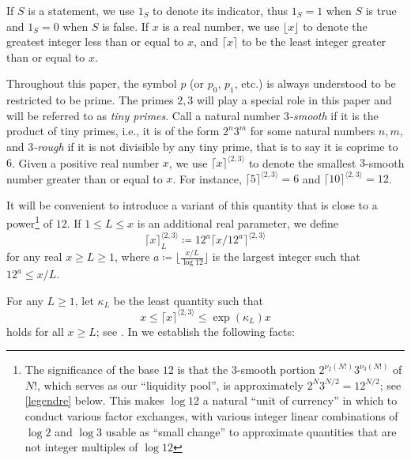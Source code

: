 \documentclass[12pt,a4paper,reqno]{amsart}
\numberwithin{equation}{section}
\theoremstyle{plain}
\theoremstyle{definition}
\begin{document}
If $S$ is a statement, we use $1_S$ to denote its indicator, thus $1_S=1$ when $S$ is true and $1_S=0$ when $S$ is false.  If $x$ is a real number, we use $\lfloor x \rfloor$ to denote the greatest integer less than or equal to $x$, and $\lceil x \rceil$ to be the least integer greater than or equal to $x$.

Throughout this paper, the symbol $p$ (or $p_0$, $p_1$, etc.) is always understood to be restricted to be prime.  The primes $2,3$ will play a special role in this paper and will be referred to as \emph{tiny primes}. 
Call a natural number \emph{$3$-smooth} if it is the product of tiny primes, i.e., it is of the form $2^n 3^m$ for some natural numbers $n,m$, and \emph{$3$-rough} if it is not divisible by any tiny prime, that is to say it is coprime to $6$.  Given a positive real number $x$, we use $\lceil x \rceil^{\langle 2,3 \rangle}$ to denote the smallest $3$-smooth number greater than or equal to $x$.  For instance, $\lceil 5 \rceil^{\langle 2,3 \rangle} = 6$ and $\lceil 10 \rceil^{\langle 2,3 \rangle} = 12$.  

It will be convenient to introduce a variant of this quantity that is close to a power\footnote{The significance of the base $12$ is that the $3$-smooth portion $2^{\nu_2(N!)} 3^{\nu_3(N!)}$ of $N!$, which serves as our ``liquidity pool'', is approximately $2^N 3^{N/2} = 12^{N/2}$; see \eqref{legendre} below.  This makes $\log 12$ a natural ``unit of currency'' in which to conduct various factor exchanges, with various integer linear combinations of $\log 2$ and $\log 3$ usable as ``small change'' to approximate quantities that are not integer multiples of $\log 12$} of $12$.  If $1 \leq L \leq x$ is an additional real parameter, we define
\begin{equation}\label{fancy-kappa-def}
  \lceil x \rceil^{\langle 2,3\rangle}_L \coloneqq 12^a \lceil x/12^a \rceil^{\langle 2,3 \rangle}
\end{equation}
for any real $x \geq L \geq 1$, where $a \coloneqq \lfloor \frac{x/L}{\log 12} \rfloor$ is the largest integer such that $12^a \leq x/L$.  

For any $L \geq 1$, let $\kappa_L$ be the least quantity such that
\begin{equation}\label{kappa-def}  
  x \leq \lceil x \rceil^{\langle 2,3\rangle} \leq \exp(\kappa_L) x 
\end{equation}
holds for all $x \geq L$; see .  In  we establish the following facts:
\end{document}
